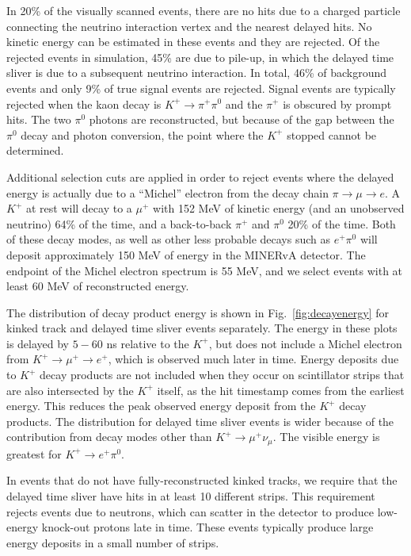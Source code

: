 \documentclass[aps,prl,preprint,showpacs,superscriptaddress,nofootinbib,floatfix,linenumbers]{revtex4}
\newcommand{\minerva}{MINERvA\xspace}
\newcommand{\numu}{\ensuremath{\nu_{\mu}}\xspace}
\newcommand{\pip}{\ensuremath{\pi^{+}}\xspace}
\newcommand{\piz}{\ensuremath{\pi^{0}}\xspace}
\newcommand{\kp}{\ensuremath{K^{+}}\xspace}
\newcommand{\mup}{\ensuremath{\mu^{+}}\xspace}
\begin{document}
In 20\% of the visually scanned events, there are no hits due to a charged particle connecting the neutrino interaction vertex and the nearest delayed hits. No kinetic energy can be estimated in these events and they are rejected. Of the rejected events in simulation, 45\% are due to pile-up, in which the delayed time sliver is due to a subsequent neutrino interaction. In total, 46\% of background events and only 9\% of true signal events are rejected. Signal events are typically rejected when the kaon decay is $\kp \rightarrow \pip \piz$ and the \pip is obscured by prompt hits. The two \piz photons are reconstructed, but because of the gap between the \piz decay and photon conversion, the point where the \kp stopped cannot be determined. 

Additional selection cuts are applied in order to reject events where the delayed energy is actually due to a ``Michel'' electron from the decay chain $\pi \rightarrow \mu \rightarrow e$. A \kp at rest will decay to a \mup with 152 MeV of kinetic energy (and an unobserved neutrino) 64\% of the time, and a back-to-back \pip and \piz 20\% of the time. Both of these decay modes, as well as other less probable decays such as $e^{+} \pi^{0}$ will deposit approximately 150 MeV of energy in the \minerva detector. The endpoint of the Michel electron spectrum is 55 MeV, and we select events with at least 60 MeV of reconstructed energy. 

The distribution of decay product energy is shown in Fig.~\ref{fig:decayenergy} for kinked track and delayed time sliver events separately. The energy in these plots is delayed by $5-60$ ns relative to the \kp, but does not include a Michel electron from $\kp \rightarrow \mup \rightarrow e^+$, which is observed much later in time. Energy deposits due to \kp decay products are not included when they occur on scintillator strips that are also intersected by the \kp itself, as the hit timestamp comes from the earliest energy. This reduces the peak observed energy deposit from the \kp decay products. The distribution for delayed time sliver events is wider because of the contribution from decay modes other than $\kp \rightarrow \mup \numu$. The visible energy is greatest for $\kp \rightarrow e^+ \piz$.

In events that do not have fully-reconstructed kinked tracks, we require that the delayed time sliver have hits in at least 10 different strips. This requirement rejects events due to neutrons, which can scatter in the detector to produce low-energy knock-out protons late in time. These events typically produce large energy deposits in a small number of strips.
\end{document}
